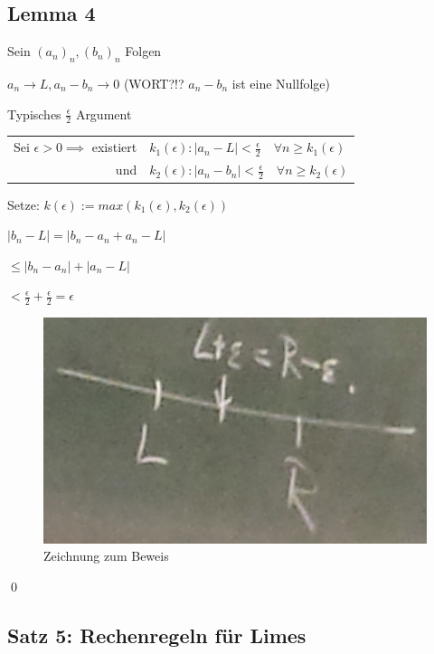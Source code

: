 \documentclass[fleqn]{scrbook}
\renewenvironment{proof}{{\bfseries Beweis }}{\qed}
\begin{document}
\subsection{Lemma 4}

Sein $(a_n)_n,(b_n)_n$ Folgen

$a_n \to L, a_n-b_n \to 0$ (WORT?!? $a_n-b_n$ ist eine Nullfolge)

\begin{proof}

  Typisches $\frac{\epsilon}{2}$ Argument
  
  \begin{tabular}{rl}
    Sei $\epsilon > 0 \implies$ existiert & $k_1(\epsilon): |a_n-L|<\frac{\epsilon}{2} \quad \forall n \geq k_1(\epsilon)$ \\
    
                                      und & $k_2(\epsilon): |a_n-b_n|<\frac{\epsilon}{2} \quad \forall n \geq k_2(\epsilon)$
  \end{tabular}
  
  Setze: $k(\epsilon):=max(k_1(\epsilon),k_2(\epsilon))$
  
  $|b_n-L| = |b_n-a_n+a_n-L|$
  
  $\leq |b_n -a_n|+|a_n-L|$
  
  $<\frac{\epsilon}{2}+\frac{\epsilon}{2}=\epsilon$
  
  \begin{figure}[!ht]
    \centering
      \includegraphics[scale=0.4]{img/2/3}
    \caption{Zeichnung zum Beweis}
  \end{figure}
 
\end{proof}

\subsection{Satz 5: Rechenregeln für Limes}
\end{document}
